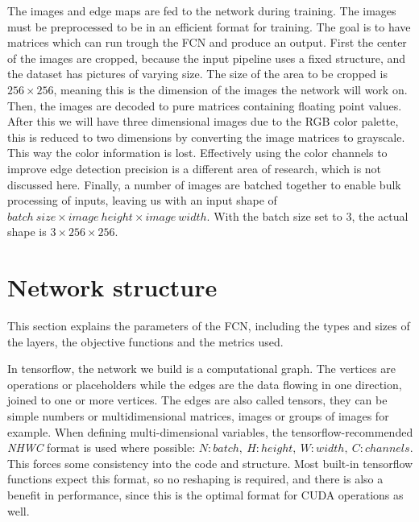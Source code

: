 \documentclass[12pt]{report}
\begin{document}
The images and edge maps are fed to the network during training. The images must be preprocessed to be in an efficient format for training. The goal is to have matrices which can run trough the FCN and produce an output. First the center of the images are cropped, because the input pipeline uses a fixed structure, and the dataset has pictures of varying size. The size of the area to be cropped is $256\times256$, meaning this is the dimension of the images the network will work on. Then, the images are decoded to pure matrices containing floating point values. After this we will have three dimensional images due to the RGB color palette, this is reduced to two dimensions by converting the image matrices to grayscale. This way the color information is lost. Effectively using the color channels to improve edge detection precision is a different area of research, which is not discussed here. Finally, a number of images are batched together to enable bulk processing of inputs, leaving us with an input shape of $ batch\ size\times image\ height\times image\ width $. With the batch size set to $3$, the actual shape is $ 3\times 256\times 256 $.
\section{Network structure}
This section explains the parameters of the FCN, including the types and sizes of the layers, the objective functions and the metrics used.

In tensorflow, the network we build is a computational graph. The vertices are operations or placeholders while the edges are the data flowing in one direction, joined to one or more vertices. The edges are also called tensors, they can be simple numbers or multidimensional matrices, images or groups of images for example.
When defining multi-dimensional variables, the tensorflow-recommended \textit{NHWC} format is used where possible: $ N:batch,\ H:height,\ W:width,\ C:channels. $ This forces some consistency into the code and structure. Most built-in tensorflow functions expect this format, so no reshaping is required, and there is also a benefit in performance, since this is the optimal format for CUDA operations as well.
\end{document}
